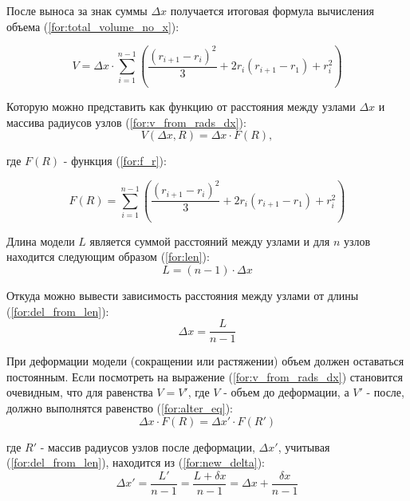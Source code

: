 После выноса за знак суммы $\Delta x$ получается итоговая формула вычисления объема (\ref{for:total_volume_no_x}):

\begin{equation}
    \label{for:total_volume_no_x}
    V = \Delta x \cdot \sum_{i=1}^{n-1} \left(\frac{(r_{i + 1} - r_i)^2}{3} + 2 r_i (r_{i + 1} - r_1) + r_i^2 \right)
\end{equation}

Которую можно представить как функцию от расстояния между узлами $\Delta x$ и массива радиусов узлов (\ref{for:v_from_rads_dx}):
\begin{equation}
    \label{for:v_from_rads_dx}
    V(\Delta x, R) = \Delta x \cdot F(R), 
\end{equation}

где $F(R)$ - функция (\ref{for:f_r}):

\begin{equation}
    \label{for:f_r}
    F(R) = \sum_{i=1}^{n-1} \left(\frac{(r_{i + 1} - r_i)^2}{3} + 2 r_i (r_{i + 1} - r_1) + r_i^2 \right)
\end{equation}


Длина модели $L$ является суммой расстояний между узлами и для $n$ узлов находится следующим образом (\ref{for:len}):
\begin{equation}
    \label{for:len}
    L = (n - 1) \cdot \Delta x
\end{equation}

Откуда можно вывести зависимость расстояния между узлами от длины (\ref{for:del_from_len}):
\begin{equation}
    \label{for:del_from_len}
    \Delta x = \frac{L}{n - 1}
\end{equation}

При деформации модели (сокращении или растяжении) объем должен оставаться постоянным. Если посмотреть на выражение (\ref{for:v_from_rads_dx}) становится очевидным, что для равенства $V = V'$, где $V$ - объем до деформации, а $V'$ - после, должно выполнятся равенство (\ref{for:alter_eq}):
\begin{equation}
    \label{for:alter_eq}
    \Delta x \cdot F(R) = \Delta x' \cdot F(R')
\end{equation}

где $R'$ - массив радиусов узлов после деформации, $\Delta x'$, учитывая (\ref{for:del_from_len}), находится из (\ref{for:new_delta}):
\begin{equation}
    \label{for:new_delta}
    \Delta x' = \frac{L'}{n - 1} = \frac{L + \delta x}{n - 1} = \Delta x + \frac{\delta x}{n - 1}
\end{equation}

